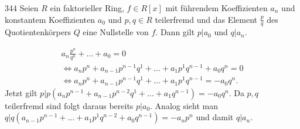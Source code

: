 \begin{algebraUE}{344}
Seien $R$ ein faktorieller Ring, $f \in R[x]$ mit führendem Koeffizienten $a_n$
und konstantem Koeffizienten $a_0$ und $p,q \in R$ teilerfremd und das Element
$\frac{p}{q}$ des Quotientenkörpers $Q$ eine Nullstelle von $f$. Dann gilt $p|a_0$
und $q | a_n$.
\end{algebraUE}

\begin{solution}
\begin{align*}
  a_n \frac{p^n}{q^n} + \dots + a_0 = 0 \\
  \iff a_np^n + a_{n-1}p^{n-1}q^1 + \dots + a_1p^1q^{n-1} + a_0q^n = 0 \\
  \iff a_np^n + a_{n-1}p^{n-1}q^1 + \dots + a_1p^1q^{n-1} = -a_0q^n.
\end{align*}
Jetzt gilt $p | p(a_np^{n-1} + a_{n-1}p^{n-2}q^1 + \dots + a_1q^{n-1}) = -a_0q^n$.
Da $p,q$ teilerfremd sind folgt daraus bereits $p | a_0$.
Analog sieht man $q |q(a_{n-1}p^{n-1} + \dots + a_1p^1q^{n-2} + a_0q^{n-1}) = -a_np^n$
und damit $q | a_n$.

\end{solution}
